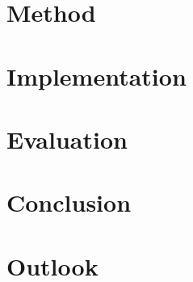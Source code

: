 \chapter{Method}
\label{ch:method}


\chapter{Implementation}
\label{ch:impl}


\chapter{Evaluation}
\label{ch:evaluation}


\chapter{Conclusion}
\label{ch:conclusion}


\chapter{Outlook}
\label{ch:outlook}


\cleardoublepage
{} \setcounter{page}{1}
\printbibliography


